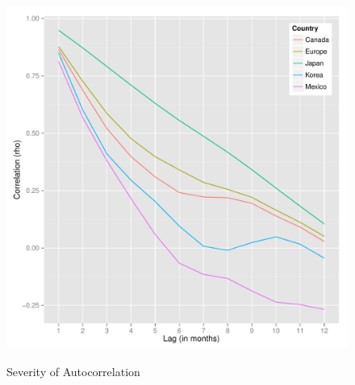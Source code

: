 \documentclass{sig-alternate-05-2015}
\begin{document}
\begin{figure}
\centering
\caption{Severity of Autocorrelation}
\includegraphics[scale=0.45]{autocorrelation.pdf}
\label{fig:autocorrelation}
\end{figure}


\end{document}
